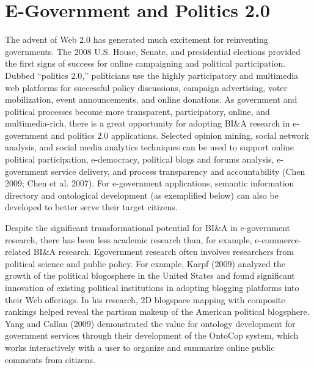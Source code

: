 \section{E-Government and Politics 2.0}

The advent of Web 2.0 has generated much excitement for
reinventing governments. The 2008 U.S. House, Senate, and
presidential elections provided the first signs of success for
online campaigning and political participation. Dubbed
“politics 2.0,” politicians use the highly participatory and
multimedia web platforms for successful policy discussions,
campaign advertising, voter mobilization, event announcements,
and online donations. As government and political
processes become more transparent, participatory, online, and
multimedia-rich, there is a great opportunity for adopting
BI\&A research in e-government and politics 2.0 applications.
Selected opinion mining, social network analysis, and social
media analytics techniques can be used to support online
political participation, e-democracy, political blogs and
forums analysis, e-government service delivery, and process
transparency and accountability (Chen 2009; Chen et al.
2007). For e-government applications, semantic information
directory and ontological development (as exemplified below)
can also be developed to better serve their target citizens.

Despite the significant transformational potential for BI\&A in
e-government research, there has been less academic research
than, for example, e-commerce-related BI\&A research. Egovernment
research often involves researchers from political
science and public policy. For example, Karpf (2009) analyzed
the growth of the political blogosphere in the United
States and found significant innovation of existing political
institutions in adopting blogging platforms into their Web
offerings. In his research, 2D blogspace mapping with composite
rankings helped reveal the partisan makeup of the
American political blogsphere. Yang and Callan (2009)
demonstrated the value for ontology development for government
services through their development of the OntoCop
system, which works interactively with a user to organize and
summarize online public comments from citizens.
